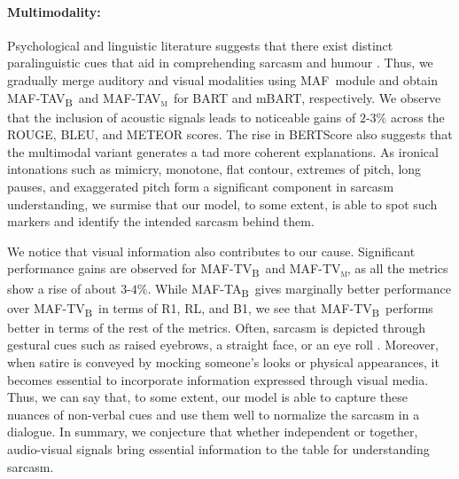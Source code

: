 \documentclass[11pt]{article}
\newcommand{\model}{\textsc{MAF}}
\newcommand{\modelTA}{\textsc{MAF-TA\textsubscript{B}}}
\newcommand{\modelTV}{\textsc{MAF-TV\textsubscript{B}}}
\newcommand{\modelTAV}{\textsc{MAF-TAV\textsubscript{B}}}
\newcommand{\modelTVm}{\textsc{MAF-TV\textsubscript{m}}}
\newcommand{\modelTAVm}{\textsc{MAF-TAV\textsubscript{m}}}
\begin{document}
\paragraph{Multimodality:} Psychological and linguistic literature suggests that there exist distinct paralinguistic cues that aid in comprehending sarcasm and humour \citep{attardo2003multimodal, Tabacaru_Lemmens_2014}. Thus, we gradually merge auditory and visual modalities using \model\ module and obtain \modelTAV\ and \modelTAVm\ for BART and mBART, respectively.
We observe that the inclusion of acoustic signals leads to noticeable gains of $2$-$3\%$ across the ROUGE, BLEU, and METEOR scores. The rise in BERTScore also suggests that the multimodal variant generates a tad more coherent explanations. As ironical intonations such as mimicry, monotone, flat contour, extremes of pitch, long pauses, and exaggerated pitch \citep{rockwell2007vocal} form a significant component in sarcasm understanding, we surmise that our model, to some extent, is able to spot such markers and identify the intended sarcasm behind them. 

We notice that visual information also contributes to our cause. Significant performance gains are observed for \modelTV\ and \modelTVm, as all the metrics show a rise of about $3$-$4\%$. While \modelTA\ gives marginally better performance over \modelTV\ in terms of R1, RL, and B1, we see that \modelTV\ performs better in terms of the rest of the metrics. Often, sarcasm is depicted through gestural cues such as raised eyebrows, a straight face, or an eye roll \citep{attardo2003multimodal}. Moreover, when satire is conveyed by mocking someone's looks or physical appearances, it becomes essential to incorporate information expressed through visual media. Thus, we can say that, to some extent, our model is able to capture these nuances of non-verbal cues and use them well to normalize the sarcasm in a dialogue. In summary, we conjecture that whether independent or together, audio-visual signals bring essential information to the table for understanding sarcasm.
\end{document}
